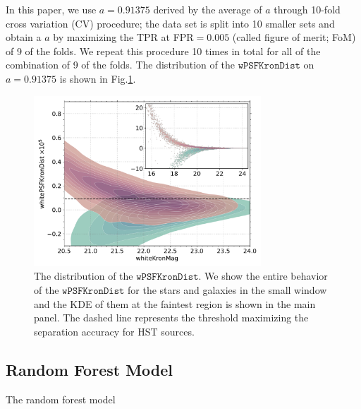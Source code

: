 \documentclass[twocolumn]{aastex62}
\begin{document}
{In this paper, we use $a=0.91375$ derived by the average of $a$ 
through 10-fold cross variation (CV) procedure;   
the data set is split into 10 smaller sets 
and obtain a $a$ by maximizing the TPR at FPR$ = 0.005$ 
(called figure of merit; FoM) of 9 of the folds. 
We repeat this procedure 10 times in total for all of the combination of 9 of the folds. 
The distribution of the $\mathtt{wPSFKronDist}$ on $a=0.91375$ is shown in Fig.\ref{fig:psfkrondist}. 

\begin{figure}[t]
 \centering
  \includegraphics[width=3.35in]{./Figures/whitePSFKronDist.pdf}
  \caption{The distribution of the $\mathtt{wPSFKronDist}$. 
We show the entire behavior of the $\mathtt{wPSFKronDist}$ for the stars and galaxies 
in the small window and the KDE of them at the faintest region is shown in the main panel. 
The dashed line represents the threshold maximizing the separation accuracy for HST sources. }
  \label{fig:psfkrondist}
\end{figure}
}


\subsection{Random Forest Model}\label{sec:rf_model}
The random forest model
\end{document}

